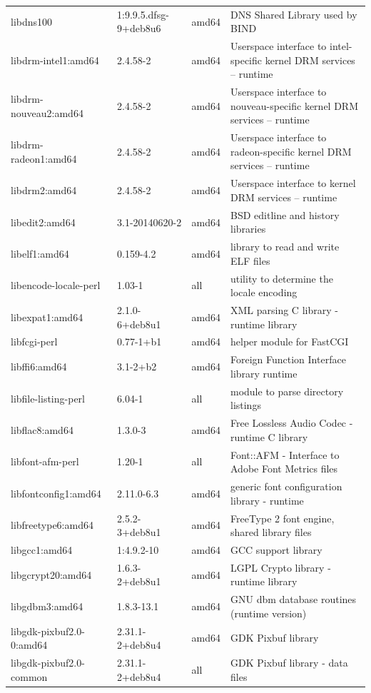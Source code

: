 \documentclass[a4paper,10pt]{article}
\begin{document}
\begin{appendices}
{\begin{longtable}{p{3.25cm}@{\hspace{0.25cm}}p{4cm}@{\hspace{0.25cm}}l@{\hspace{0.25cm}}p{7cm}}
libdns100	&	1:9.9.5.dfsg-9+deb8u6	&	amd64	&	DNS Shared Library used by BIND	\\
libdrm-intel1:amd64	&	2.4.58-2	&	amd64	&	Userspace interface to intel-specific kernel DRM services -- runtime	\\
libdrm-nouveau2:amd64	&	2.4.58-2	&	amd64	&	Userspace interface to nouveau-specific kernel DRM services -- runtime	\\
libdrm-radeon1:amd64	&	2.4.58-2	&	amd64	&	Userspace interface to radeon-specific kernel DRM services -- runtime	\\
libdrm2:amd64	&	2.4.58-2	&	amd64	&	Userspace interface to kernel DRM services -- runtime	\\
libedit2:amd64	&	3.1-20140620-2	&	amd64	&	BSD editline and history libraries	\\
libelf1:amd64	&	0.159-4.2	&	amd64	&	library to read and write ELF files	\\
libencode-locale-perl	&	1.03-1	&	all	&	utility to determine the locale encoding	\\
libexpat1:amd64	&	2.1.0-6+deb8u1	&	amd64	&	XML parsing C library - runtime library	\\
libfcgi-perl	&	0.77-1+b1	&	amd64	&	helper module for FastCGI	\\
libffi6:amd64	&	3.1-2+b2	&	amd64	&	Foreign Function Interface library runtime	\\
libfile-listing-perl	&	6.04-1	&	all	&	module to parse directory listings	\\
libflac8:amd64	&	1.3.0-3	&	amd64	&	Free Lossless Audio Codec - runtime C library	\\
libfont-afm-perl	&	1.20-1	&	all	&	Font::AFM - Interface to Adobe Font Metrics files	\\
libfontconfig1:amd64	&	2.11.0-6.3	&	amd64	&	generic font configuration library - runtime	\\
libfreetype6:amd64	&	2.5.2-3+deb8u1	&	amd64	&	FreeType 2 font engine, shared library files	\\
libgcc1:amd64	&	1:4.9.2-10	&	amd64	&	GCC support library	\\
libgcrypt20:amd64	&	1.6.3-2+deb8u1	&	amd64	&	LGPL Crypto library - runtime library	\\
libgdbm3:amd64	&	1.8.3-13.1	&	amd64	&	GNU dbm database routines (runtime version)	\\
libgdk-pixbuf2.0-0:amd64	&	2.31.1-2+deb8u4	&	amd64	&	GDK Pixbuf library	\\
libgdk-pixbuf2.0-common	&	2.31.1-2+deb8u4	&	all	&	GDK Pixbuf library - data files	\\

\end{longtable}}
\end{appendices}
\end{document}

